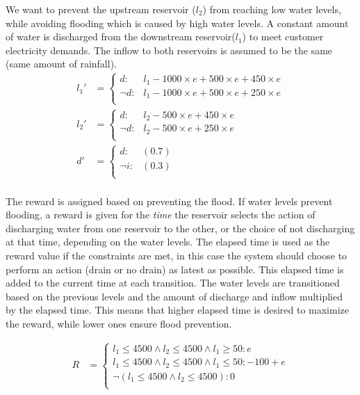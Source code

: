 \documentclass[letterpaper]{article}
\begin{document}
We want to prevent the upstream reservoir ($l_2$) from reaching low water levels, while avoiding flooding which is caused by high water levels. A constant amount of water is discharged from the downstream reservoir($l_1$) to meet customer electricity demands. The inflow to both reservoirs is assumed to be the same (same amount of rainfall). 
{\footnotesize
\begin{align*}
l_1' & = \begin{cases}
d     : & l_1 - 1000 \times e + 500 \times e  +450 \times e \\
\neg d: &  l_1 - 1000 \times e + 500 \times e  +250 \times e \\
\end{cases}\\
l_2' & =  \begin{cases}
d     : & l_2 - 500 \times e  +450 \times e \\
\neg d: &  l_2 - 500 \times e  +250 \times e \\
 \end{cases}\\
d' & = \begin{cases}
d     : & (0.7) \\
\neg i: &  (0.3)   \\
\end{cases}\\
\end{align*}}

The reward is assigned based on preventing the flood. If water levels prevent flooding, a reward is given for the \textit{time} the reservoir selects the action of discharging water from one reservoir to the other, or the choice of not discharging at that time, depending on the water levels. The elapsed time is used as the reward value if the constraints are met, in this case the system should choose to perform an action (drain or no drain) as latest as possible. 
This elapsed time is added to the current time at each transition. The water levels are transitioned based on the previous levels and the amount of discharge and inflow multiplied by the elapsed time. This means that higher elapsed time is desired to maximize the reward, while lower ones ensure flood prevention.

{\footnotesize
\begin{align*}
R & = \begin{cases}
l_1 \leq 4500 \wedge l_2 \leq 4500 \wedge   l_1\geq 50 : e \\
l_1 \leq 4500 \wedge l_2 \leq 4500 \wedge   l_1\leq 50 : -100+e \\
\neg(l_1 \leq 4500 \wedge l_2 \leq 4500) : 0 \\
\end{cases}
\end{align*}}
\end{document}
